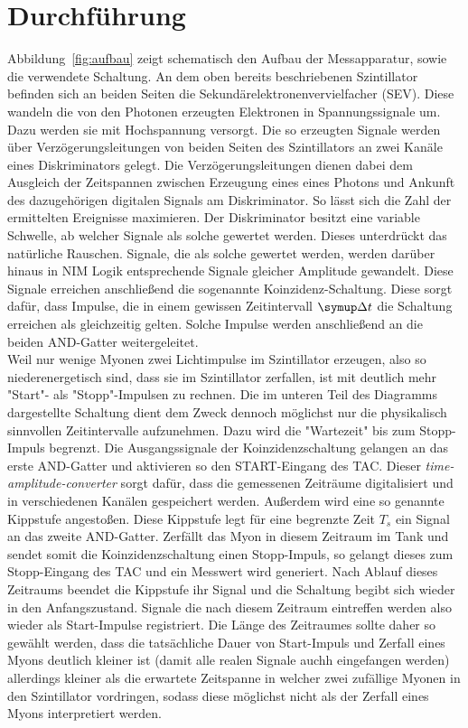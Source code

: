 \section{Durchführung}
\label{sec:durchführung}

Abbildung~\ref{fig:aufbau} zeigt schematisch den Aufbau der Messapparatur, sowie die verwendete Schaltung. An dem oben bereits beschriebenen Szintillator befinden sich an beiden Seiten die Sekundärelektronenvervielfacher (SEV). Diese wandeln die von den Photonen erzeugten Elektronen in Spannungssignale um. Dazu werden sie mit Hochspannung versorgt. Die so erzeugten Signale werden über Verzögerungsleitungen von beiden Seiten des Szintillators an zwei Kanäle eines Diskriminators gelegt. Die Verzögerungsleitungen dienen dabei dem Ausgleich der Zeitspannen zwischen Erzeugung eines eines Photons und Ankunft des dazugehörigen digitalen Signals am Diskriminator. So lässt sich die Zahl der ermittelten Ereignisse maximieren. Der Diskriminator besitzt eine variable Schwelle, ab welcher Signale als solche gewertet werden. Dieses unterdrückt das natürliche Rauschen. Signale, die als solche gewertet werden, werden darüber hinaus in NIM Logik entsprechende Signale gleicher Amplitude gewandelt. Diese Signale erreichen anschließend die sogenannte Koinzidenz-Schaltung. Diese sorgt dafür, dass Impulse, die in einem gewissen Zeitintervall $\upD t$ die Schaltung erreichen als gleichzeitig gelten. Solche Impulse werden anschließend an die beiden AND-Gatter weitergeleitet. \\
Weil nur wenige Myonen zwei Lichtimpulse im Szintillator erzeugen, also so niederenergetisch sind, dass sie im Szintillator zerfallen, ist mit deutlich mehr "Start"- als "Stopp"-Impulsen zu rechnen. Die im unteren Teil des Diagramms dargestellte Schaltung dient dem Zweck dennoch möglichst nur die physikalisch sinnvollen Zeitintervalle aufzunehmen. Dazu wird die "Wartezeit" bis zum Stopp-Impuls begrenzt. Die Ausgangssignale der Koinzidenzschaltung gelangen an das erste AND-Gatter und aktivieren so den START-Eingang des TAC. Dieser \textit{time-amplitude-converter} sorgt dafür, dass die gemessenen Zeiträume digitalisiert und in verschiedenen Kanälen gespeichert werden. Außerdem wird eine so genannte Kippstufe angestoßen. Diese Kippstufe legt für eine begrenzte Zeit $T_s$ ein Signal an das zweite AND-Gatter. Zerfällt das Myon in diesem Zeitraum im Tank und sendet somit die Koinzidenzschaltung einen Stopp-Impuls, so gelangt dieses zum Stopp-Eingang des TAC und ein Messwert wird generiert. Nach Ablauf dieses Zeitraums beendet die Kippstufe ihr Signal und die Schaltung begibt sich wieder in den Anfangszustand. Signale die nach diesem Zeitraum eintreffen werden also wieder als Start-Impulse registriert. Die Länge des Zeitraumes sollte daher so gewählt werden, dass die tatsächliche Dauer von Start-Impuls und Zerfall eines Myons deutlich kleiner ist (damit alle realen Signale auchh eingefangen werden) allerdings kleiner als die erwartete Zeitspanne in welcher zwei zufällige Myonen in den Szintillator vordringen, sodass diese möglichst nicht als der Zerfall eines Myons interpretiert werden.
